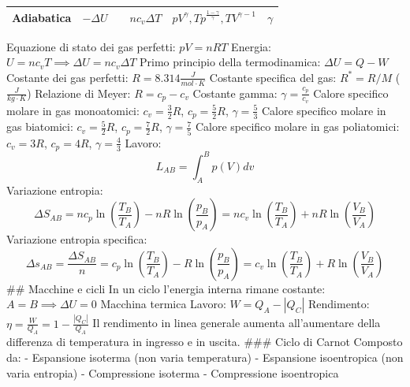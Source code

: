 \begin{longtable}[]{@{}lccccc@{}}
\begin{minipage}[t]{0.07\columnwidth}
Adiabatica\strut
\end{minipage} & \begin{minipage}[t]{0.13\columnwidth}\centering
\(-\Delta U\)\strut
\end{minipage} & \begin{minipage}[t]{0.09\columnwidth}\centering
0\strut
\end{minipage} & \begin{minipage}[t]{0.09\columnwidth}\centering
\(nc_v\Delta T\)\strut
\end{minipage} & \begin{minipage}[t]{0.39\columnwidth}\centering
\(pV^\gamma , Tp^{\frac{1-\gamma}{\gamma}}, TV^{\gamma-1}\)\strut
\end{minipage} & \begin{minipage}[t]{0.05\columnwidth}\centering
\(\gamma\)\strut
\end{minipage}\tabularnewline
\bottomrule
\end{longtable}

Equazione di stato dei gas perfetti: \(pV=nRT\) Energia:
\(U=nc_vT\implies \Delta U = nc_v\Delta T\) Primo principio della
termodinamica: \(\Delta U = Q-W\) Costante dei gas perfetti:
\(R=8.314 \frac{J}{mol\cdot K}\) Costante specifica del gas: \(R^*=R/M\)
(\(\frac{J}{kg\cdot K}\)) Relazione di Meyer: \(R=c_p-c_v\) Costante
gamma: \(\gamma=\frac{c_p}{c_v}\) Calore specifico molare in gas
monoatomici: \(c_v=\frac{3}{2}R\), \(c_p=\frac{5}{2}R\),
\(\gamma=\frac{5}{3}\) Calore specifico molare in gas biatomici:
\(c_v=\frac{5}{2}R\), \(c_p=\frac{7}{2}R\), \(\gamma=\frac{7}{5}\)
Calore specifico molare in gas poliatomici: \(c_v=3R\), \(c_p=4R\),
\(\gamma=\frac{4}{3}\) Lavoro: \[L_{AB}=\int_A^B p(V)dv\] Variazione
entropia:
\[\Delta S_{AB}=nc_p\ln{\left(\frac{T_B}{T_A}\right)}-nR\ln{\left(\frac{p_B}{p_A}\right)}=nc_v\ln{\left(\frac{T_B}{T_A}\right)}+nR\ln{\left(\frac{V_B}{V_A}\right)}\]
Variazione entropia specifica:
\[\Delta s_{AB}=\frac{\Delta S_{AB}}{n}=c_p\ln{\left(\frac{T_B}{T_A}\right)}-R\ln{\left(\frac{p_B}{p_A}\right)}=c_v\ln{\left(\frac{T_B}{T_A}\right)}+R\ln{\left(\frac{V_B}{V_A}\right)}\]
\#\# Macchine e cicli In un ciclo l'energia interna rimane costante:
\(A = B \implies \Delta U= 0\) Macchina termica Lavoro:
\(W = Q_A-|Q_C|\) Rendimento:
\(\eta =\frac{W}{Q_A}=1-\frac{|Q_C|}{Q_A}\) Il rendimento in linea
generale aumenta all'aumentare della differenza di temperatura in
ingresso e in uscita. \#\#\# Ciclo di Carnot Composto da: - Espansione
isoterma (non varia temperatura) - Espansione isoentropica (non varia
entropia) - Compressione isoterma - Compressione isoentropica

